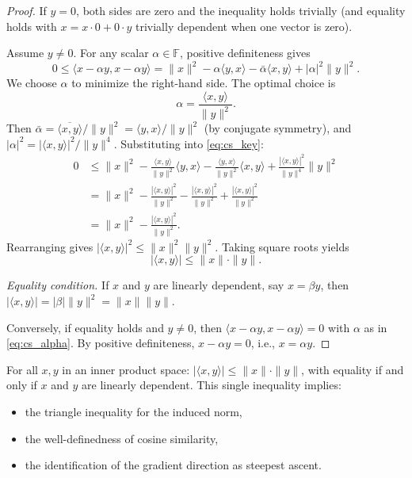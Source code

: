 \documentclass[11pt,a4paper]{article}
\begin{document}
\begin{proof}
If $y = 0$, both sides are zero and the inequality holds trivially (and
equality holds with $x = x \cdot 0 + 0 \cdot y$ trivially dependent when
one vector is zero).

Assume $y \ne 0$. For any scalar $\alpha \in \mathbb{F}$, positive
definiteness gives
\begin{equation}
\label{eq:cs_key}
0 \le \langle x - \alpha y, x - \alpha y \rangle
= \|x\|^2 - \alpha \langle y, x \rangle
  - \bar{\alpha} \langle x, y \rangle
  + |\alpha|^2 \|y\|^2.
\end{equation}
We choose $\alpha$ to minimize the right-hand side. The optimal choice is
\begin{equation}
\label{eq:cs_alpha}
\alpha = \frac{\langle x, y \rangle}{\|y\|^2}.
\end{equation}
Then $\bar{\alpha} = \overline{\langle x, y \rangle} / \|y\|^2
= \langle y, x \rangle / \|y\|^2$ (by conjugate symmetry), and
$|\alpha|^2 = |\langle x, y \rangle|^2 / \|y\|^4$. Substituting into
\eqref{eq:cs_key}:
\begin{align*}
0 &\le \|x\|^2
    - \frac{\langle x, y \rangle}{\|y\|^2} \langle y, x \rangle
    - \frac{\langle y, x \rangle}{\|y\|^2} \langle x, y \rangle
    + \frac{|\langle x, y \rangle|^2}{\|y\|^4} \|y\|^2 \\
  &= \|x\|^2
    - \frac{|\langle x, y \rangle|^2}{\|y\|^2}
    - \frac{|\langle x, y \rangle|^2}{\|y\|^2}
    + \frac{|\langle x, y \rangle|^2}{\|y\|^2} \\
  &= \|x\|^2 - \frac{|\langle x, y \rangle|^2}{\|y\|^2}.
\end{align*}
Rearranging gives $|\langle x, y \rangle|^2 \le \|x\|^2 \|y\|^2$. Taking
square roots yields
\[
|\langle x, y \rangle| \le \|x\| \cdot \|y\|.
\]

\emph{Equality condition.} If $x$ and $y$ are linearly dependent, say
$x = \beta y$, then
$|\langle x, y \rangle| = |\beta| \|y\|^2 = \|x\| \|y\|$.

Conversely, if equality holds and $y \ne 0$, then
$\langle x - \alpha y, x - \alpha y \rangle = 0$ with $\alpha$ as in
\eqref{eq:cs_alpha}. By positive definiteness, $x - \alpha y = 0$, i.e.,
$x = \alpha y$.
\end{proof}

\begin{keyresult}[title={The Cauchy--Schwarz Inequality}]
For all $x, y$ in an inner product space:
$|\langle x, y \rangle| \le \|x\| \cdot \|y\|$, with equality if and only
if $x$ and $y$ are linearly dependent. This single inequality implies:
\begin{itemize}[nosep]
    \item the triangle inequality for the induced norm,
    \item the well-definedness of cosine similarity,
    \item the identification of the gradient direction as steepest ascent.
\end{itemize}
\end{keyresult}
\end{document}
